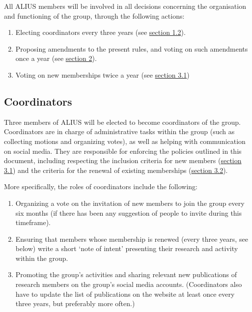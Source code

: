 \documentclass[a4paper, 11pt]{scrartcl}
\begin{document}
\noindent All ALIUS members will be involved in all decisions concerning the organisation and functioning of the group, through the following actions:

\begin{enumerate}
\item Electing coordinators every three years (see \hyperref[coordinators]{section 1.2}).
\item Proposing amendments to the present rules, and voting on such amendments once a year (see \hyperref[modif]{section 2}).
\item Voting on new memberships twice a year (see \hyperref[new_memberships]{section 3.1})

\end{enumerate}

\subsection{Coordinators}
\label{coordinators}

Three members of ALIUS will be elected to become coordinators of the group. Coordinators are in charge of administrative tasks within the group (such as collecting motions and organizing votes), as well as helping with communication on social media. They are responsible for enforcing the policies outlined in this document, including respecting the inclusion criteria for new members (\hyperref[new_memberships]{section 3.1}) and the criteria for the renewal of existing memberships (\hyperref[membership_renewal]{section 3.2}).

More specifically, the roles of coordinators include the following:

\begin{enumerate}

\item Organizing a vote on the invitation of new members to join the group every six months (if there has been any suggestion of people to invite during this timeframe).
\item Ensuring that members whose membership is renewed (every three years, see below) write a short `note of intent' presenting their research and activity within the group.
\item Promoting the group's activities and sharing relevant new publications of research members on the group's social media accounts. (Coordinators also have to update the list of publications on the website at least once every three years, but preferably more often.)

\end{enumerate}
\end{document}

